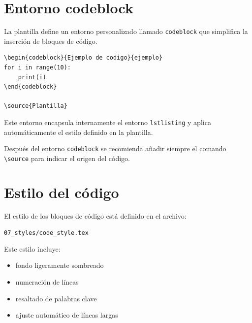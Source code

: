 



\section{Entorno codeblock}

La plantilla define un entorno personalizado llamado
\texttt{codeblock} que simplifica la inserción de
bloques de código.

\begin{lstlisting}[caption={Uso del entorno codeblock},label={code:codeblock}]
\begin{codeblock}{Ejemplo de codigo}{ejemplo}
for i in range(10):
    print(i)
\end{codeblock}

\source{Plantilla}
\end{lstlisting}




Este entorno encapsula internamente el entorno
\texttt{lstlisting} y aplica automáticamente el
estilo definido en la plantilla.



\begin{notebox}
Después del entorno \texttt{codeblock} se recomienda
añadir siempre el comando \texttt{\textbackslash source}
para indicar el origen del código.
\end{notebox}




\section{Estilo del código}

El estilo de los bloques de código está definido en
el archivo:

\texttt{07\_styles/code\_style.tex}

Este estilo incluye:

\begin{itemize}

\item fondo ligeramente sombreado
\item numeración de líneas
\item resaltado de palabras clave
\item ajuste automático de líneas largas

\end{itemize}




